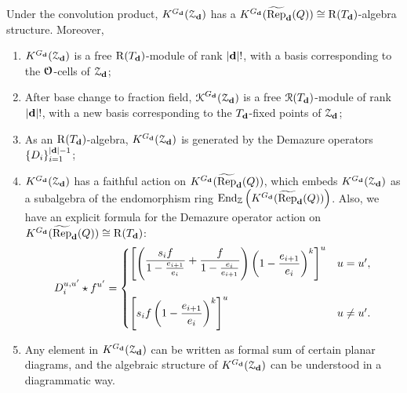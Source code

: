 \begin{theoremA}\label{thm:A}
Under the convolution product, $K^{G_{\mathbf{d}}}(\operatorname{\mathcal{Z}}_{\mathbf{d}})$ has a $K^{G_{\mathbf{d}}}(\operatorname{\widetilde{\operatorname{Rep}}}_{\mathbf{d}}(Q)) \cong \operatorname{\operatorname{R}}(T_{\mathbf{d}})$-algebra structure. Moreover,
\begingroup
\upshape
{}
\renewcommand\labelenumi{(\theenumi)}
\begin{enumerate}
\item $K^{G_{\mathbf{d}}}(\operatorname{\mathcal{Z}}_{\mathbf{d}})$ is a free $\operatorname{\operatorname{R}}(T_{\mathbf{d}})$-module of rank $|\mathbf{d}|!$, with a basis corresponding to the $\boldsymbol{\mathcal{O}}$-cells of $\operatorname{\mathcal{Z}}_{\mathbf{d}}$;\label{item:A1}
\item After base change to fraction field, $\operatorname{\operatorname{\mathcal{K}}}^{G_{\mathbf{d}}}(\operatorname{\mathcal{Z}}_{\mathbf{d}})$ is a free $\operatorname{\operatorname{\mathcal{R}}}(T_{\mathbf{d}})$-module of rank $|\mathbf{d}|!$, with a new basis corresponding to the $T_{\mathbf{d}}$-fixed points of $\operatorname{\mathcal{Z}}_{\mathbf{d}}$;\label{item:A2}
\item As an $\operatorname{\operatorname{R}}(T_{\mathbf{d}})$-algebra, $K^{G_{\mathbf{d}}}(\operatorname{\mathcal{Z}}_{\mathbf{d}})$ is generated by the Demazure operators $\{D_i\}_{i=1}^{|\mathbf{d}|-1}$;\label{item:A3}
\item $K^{G_{\mathbf{d}}}(\operatorname{\mathcal{Z}}_{\mathbf{d}})$ has a faithful action on $K^{G_{\mathbf{d}}}(\operatorname{\widetilde{\operatorname{Rep}}}_{\mathbf{d}}(Q))$, which embeds $K^{G_{\mathbf{d}}}(\operatorname{\mathcal{Z}}_{\mathbf{d}})$ as a subalgebra of the endomorphism ring $\operatorname{\operatorname{End}}_{\mathbb{Z}}\label{item:A4} \left(K^{G_{\mathbf{d}}}(\operatorname{\widetilde{\operatorname{Rep}}}_{\mathbf{d}}(Q))\right)$. Also, we have an explicit formula for the Demazure operator action on $K^{G_{\mathbf{d}}}(\operatorname{\widetilde{\operatorname{Rep}}}_{\mathbf{d}}(Q)) \cong \operatorname{\operatorname{R}}(T_{\mathbf{d}})$:
\begin{equation*}\label{eq:Demazure_operator_copy}
D_i^{u,u'} \star f^{u'}=\begin{cases}
\left[\left( \raisebox{1mm}{$\displaystyle\frac{s_i f}{ 1-\frac{e_{i+1}}{e_{i}}}     + \frac{f}{1-\frac{e_{i}}{e_{i+1}}}$}  \right)\left(\displaystyle 1-\frac{e_{i+1}}{e_{i}}\right)^{k} \right]^{u} & u=u',\\[8mm]
\left[s_i f  \left(\displaystyle 1-\frac{e_{i+1}}{e_{i}}\right)^{k} \right]^{u} & u \neq u'.
\end{cases}
\end{equation*}
\item Any element in $K^{G_{\mathbf{d}}}(\operatorname{\mathcal{Z}}_{\mathbf{d}})$ can be written as formal sum of certain planar diagrams, and the algebraic structure of $K^{G_{\mathbf{d}}}(\operatorname{\mathcal{Z}}_{\mathbf{d}})$ can be understood in a diagrammatic way.\label{item:A5}
\end{enumerate} 
\endgroup
\end{theoremA}

